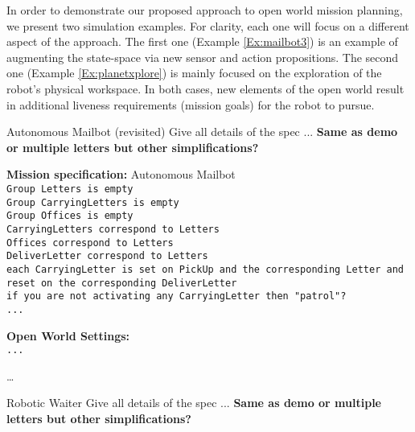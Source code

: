In order to demonstrate our proposed approach to open world mission planning, we present two simulation examples. For clarity, each one will focus on a different aspect of the approach. The first one (Example \ref{Ex:mailbot3}) is an example of augmenting the state-space via new sensor and action propositions. The second one (Example \ref{Ex:planetxplore}) is mainly focused on the exploration of the robot's physical workspace. In both cases, new elements of the open world result in additional liveness requirements (mission goals) for the robot to pursue.

\begin{myExample}\label{Ex:mailbot3} Autonomous Mailbot (revisited)
	Give all details of the spec ... \textbf{Same as demo or multiple letters but other simplifications?}
\end{myExample}

\begin{algorithm}
	\textbf{Mission specification:} Autonomous Mailbot\\
	{\small
	\texttt{Group Letters is empty}\\
	\texttt{Group CarryingLetters is empty}\\
	\texttt{Group Offices is empty}\\
	
	\texttt{CarryingLetters correspond to Letters}\\
	\texttt{Offices correspond to Letters}\\
	\texttt{DeliverLetter correspond to Letters}\\
	
	\texttt{each CarryingLetter is set on PickUp and the corresponding Letter and reset on the corresponding DeliverLetter}\\
	
	\texttt{if you are not activating any CarryingLetter then "patrol"?}\\
	\texttt{...}\\
	}
	
	\textbf{Open World Settings:}\\
	{\small
	\texttt{...} 
	}
\end{algorithm}

\ldots

\begin{myExample}\label{Ex:restaurant} Robotic Waiter
	Give all details of the spec ... \textbf{Same as demo or multiple letters but other simplifications?}
\end{myExample}

